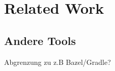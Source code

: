 \chapter{Related Work}\label{chap:relatedwork}
\section{Andere Tools}
Abgrenzung zu z.B Bazel/Gradle?

